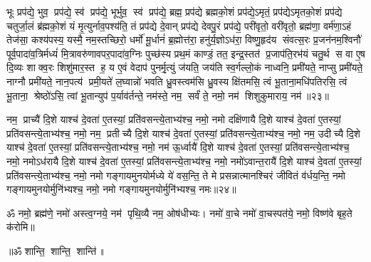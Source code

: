 भूः प्रप॑द्ये॒ भुव॒ प्रप॑द्ये॒ स्व॑ प्रप॑द्ये॒ भूर्भुव॒ स्व॑ प्रप॑द्ये॒ ब्रह्म॒ प्रप॑द्ये ब्रह्मको॒शं प्रप॑द्ये॒ऽमृतं॒ प्रप॑द्येऽमृतको॒शं प्रप॑द्ये चतुर्जा॒लं ब्र॑ह्मको॒शं यं मृ॒त्युर्नाव॒पश्य॑ति॒ तं प्रप॑द्ये दे॒वान् प्रप॑द्ये देवपु॒रं प्रप॑द्ये॒ परी॑वृतो॒ वरी॑वृतो॒ ब्रह्म॑णा॒ वर्म॑णा॒ऽहं तेज॑सा॒ कश्य॑पस्य॒ यस्मै॒ नम॒स्तच्छिरो॒ धर्मो॑ मू॒र्धानं॑ ब्र॒ह्मोत्त॑रा॒ हनु॑र्य॒ज्ञोऽध॑रा॒ विष्णु॒\ar{}हृद॑य संवत्स॒रः प्र॒जन॑नम॒श्विनौ॑ पूर्व॒पादा॑व॒त्रिर्मध्यं॑ मि॒त्रावरु॑णावपर॒पादा॑व॒ग्निः पुच्छ॑स्य प्रथ॒मं काण्डं॒ तत॒ इन्द्र॒स्तत॑ प्र॒जाप॑ति॒रभ॑यं चतु॒र्थ स वा ए॒ष दि॒व्यः शाक्व॒रः शिशु॑मार॒स्त ह॒ य ए॒वं वेदाप॑ पुनर्मृ॒त्युं ज॑यति॒ जय॑ति स्व॒र्गल्लो॒कं नाध्वनि॒ प्रमी॑यते॒ नाप्सु प्रमी॑यते॒ नाग्नौ प्रमी॑यते॒ नान॒पत्य॑ प्रमी॒यते॑ ल॒घ्वान्नो॑ भवति ध्रु॒वस्त्वम॑सि ध्रु॒वस्य क्षि॑तमसि॒ त्वं भू॒ताना॒मधि॑पतिरसि॒ त्वं भू॒ताना॒ श्रेष्ठो॑ऽसि॒ त्वां भू॒तान्युप॑ प॒र्याव॑र्तन्ते॒ नम॑स्ते॒ नम॒ सर्वं॑ ते॒ नमो॒ नम॑ शिशुकुमाराय॒ नम॑॥२३॥
\anuvakamend

नम॒ प्राच्यै॑ दि॒शे याश्च॑ दे॒वता॑ ए॒तस्यां॒ प्रति॑वसन्त्ये॒ताभ्य॑श्च॒  नमो॒ नमो दक्षि॑णायै दि॒शे याश्च॑ दे॒वता॑ ए॒तस्यां॒ प्रति॑वसन्त्ये॒ताभ्य॑श्च॒  नमो॒ नम॒ प्रतीच्यै दि॒शे याश्च॑ दे॒वता॑ ए॒तस्यां॒ प्रति॑वसन्त्ये॒ताभ्य॑श्च॒  नमो॒ नम॒ उदीच्यै दि॒शे याश्च॑ दे॒वता॑ ए॒तस्यां॒ प्रति॑वसन्त्ये॒ताभ्य॑श्च॒  नमो॒ नम॑ ऊ॒र्ध्वायै॑ दि॒शे याश्च॑ दे॒वता॑ ए॒तस्यां॒ प्रति॑वसन्त्ये॒ताभ्य॑श्च॒  नमो॒ नमोऽध॑रायै दि॒शे याश्च॑ दे॒वता॑ ए॒तस्यां॒ प्रति॑वसन्त्ये॒ताभ्य॑श्च॒  नमो॒ नमो॑ऽवान्त॒रायै॑ दि॒शे याश्च॑ दे॒वता॑ ए॒तस्यां॒ प्रति॑वसन्त्ये॒ताभ्य॑श्च॒  नमो॒ नमो गङ्गायमुनयोर्मध्ये ये॑ वस॒न्ति॒ ते मे प्रसन्नात्मानश्चिरं जीवितं व॑र्धय॒न्ति॒ नमो गङ्गायमुनयोर्मुनि॑भ्यश्च॒ नमो॒ नमो गङ्गायमुनयोर्मुनि॑भ्यश्च॒ नमः॥२४॥
\anuvakamend

ॐ नमो॒ ब्रह्म॑णे॒ नमो॑ अस्त्व॒ग्नये॒ नम॑ पृथि॒व्यै नम॒ ओष॑धीभ्यः। नमो॑ वा॒चे नमो॑ वा॒चस्पत॑ये॒ नमो॒ विष्ण॑वे बृह॒ते क॑रोमि॥\\
\centerline{॥ॐ शान्ति॒ शान्ति॒ शान्ति॑॥}
